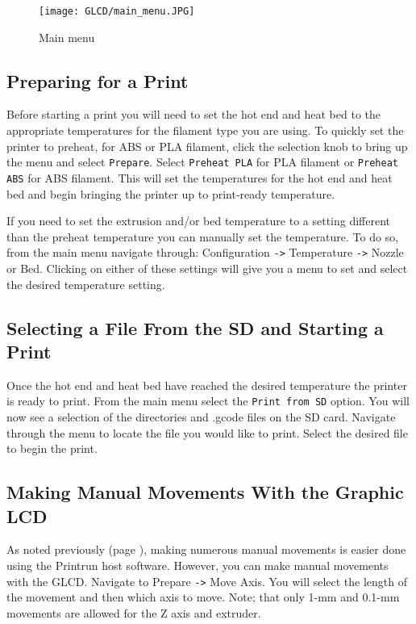\begin{figure}[h]
\centering
\texttt{[image: GLCD/main\_menu.JPG]}
\caption{Main menu}
\label{fig:main_menu}
\end{figure}

\subsection{Preparing for a Print}
Before starting a print you will need to set the hot end and heat bed to the appropriate temperatures for the filament type you are using. To quickly set the printer to preheat, for ABS or PLA filament, click the selection knob to bring up the menu and select \texttt{Prepare}. Select \texttt{Preheat PLA} for PLA filament or \texttt{Preheat ABS} for ABS filament. This will set the temperatures for the hot end and heat bed and begin bringing the printer up to print-ready temperature.

If you need to set the extrusion and/or bed temperature to a setting different than the preheat temperature you can manually set the temperature. To do so, from the main menu navigate through: Configuration \texttt{->} Temperature \texttt{->} Nozzle or Bed. Clicking on either of these settings will give you a menu to set and select the desired temperature setting.

\subsection{Selecting a File From the SD and Starting a Print}
Once the hot end and heat bed have reached the desired temperature the printer is ready to print. From the main menu select the \texttt{Print from SD} option. You will now see a selection of the directories and .gcode files on the SD card. Navigate through the menu to locate the file you would like to print. Select the desired file to begin the print.

\subsection{Making Manual Movements With the Graphic LCD}
As noted previously (page \pageref{sec:Graphic LCD or Printrun Host?}), making numerous manual movements is easier done using the Printrun host software. However, you can make manual movements with the GLCD. Navigate to Prepare \texttt{->} Move Axis. You will select the length of the movement and then which axis to move. Note; that only 1-mm and 0.1-mm movements are allowed for the Z axis and extruder.

